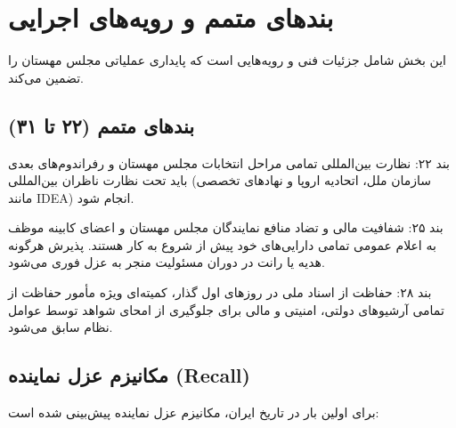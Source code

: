 \chapter{بندهای متمم و رویه‌های اجرایی}
\label{app:clauses}

این بخش شامل جزئیات فنی و رویه‌هایی است که پایداری عملیاتی مجلس مهستان را تضمین می‌کند.

\section{بندهای متمم (۲۲ تا ۳۱)}

\begin{modernbox}{بند ۲۲: نظارت بین‌المللی}
تمامی مراحل انتخابات مجلس مهستان و رفراندوم‌های بعدی باید تحت نظارت ناظران بین‌المللی (سازمان ملل، اتحادیه اروپا و نهادهای تخصصی مانند IDEA) انجام شود.
\end{modernbox}

\begin{modernbox}{بند ۲۵: شفافیت مالی و تضاد منافع}
نمایندگان مجلس مهستان و اعضای کابینه موظف به اعلام عمومی تمامی دارایی‌های خود پیش از شروع به کار هستند. پذیرش هرگونه هدیه یا رانت در دوران مسئولیت منجر به عزل فوری می‌شود.
\end{modernbox}

\begin{modernbox}{بند ۲۸: حفاظت از اسناد ملی}
در روزهای اول گذار، کمیته‌ای ویژه مأمور حفاظت از تمامی آرشیوهای دولتی، امنیتی و مالی برای جلوگیری از امحای شواهد توسط عوامل نظام سابق می‌شود.
\end{modernbox}

\section{مکانیزم عزل نماینده (Recall)}

برای اولین بار در تاریخ ایران، مکانیزم عزل نماینده پیش‌بینی شده است:

\begin{center}
\end{center}

